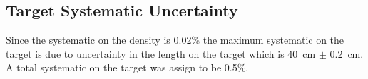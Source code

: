 \subsection{Target Systematic Uncertainty}
 	Since the systematic on the density is 0.02\% the maximum systematic on the target is due to uncertainty in the length on the target which is 40~cm $\pm$ 0.2~cm. A total systematic on the target was assign to be 0.5\%. 
